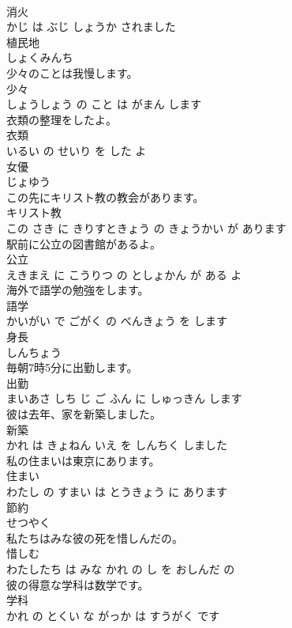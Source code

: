 \documentclass[8pt]{extreport}
\begin{document}
\begin{CJK}{UTF8}{min}
\\	消火 
\\	かじ は ぶじ しょうか されました			
\\	植民地	
\\	しょくみんち			
\\	少々のことは我慢します。	
\\	少々 
\\	しょうしょう の こと は がまん します			
\\	衣類の整理をしたよ。	
\\	衣類 
\\	いるい の せいり を した よ			
\\	女優	
\\	じょゆう			
\\	この先にキリスト教の教会があります。	
\\	キリスト教 
\\	この さき に きりすときょう の きょうかい が あります			
\\	駅前に公立の図書館があるよ。	
\\	公立 
\\	えきまえ に こうりつ の としょかん が ある よ			
\\	海外で語学の勉強をします。	
\\	語学 
\\	かいがい で ごがく の べんきょう を します			
\\	身長	
\\	しんちょう			
\\	毎朝7時5分に出勤します。	
\\	出勤 
\\	まいあさ しち じ ご ふん に しゅっきん します			
\\	彼は去年、家を新築しました。	
\\	新築 
\\	かれ は きょねん いえ を しんちく しました			
\\	私の住まいは東京にあります。	
\\	住まい 
\\	わたし の すまい は とうきょう に あります			
\\	節約	
\\	せつやく			
\\	私たちはみな彼の死を惜しんだの。	
\\	惜しむ 
\\	わたしたち は みな かれ の し を おしんだ の			
\\	彼の得意な学科は数学です。	
\\	学科 
\\	かれ の とくい な がっか は すうがく です			

\end{CJK}
\end{document}

